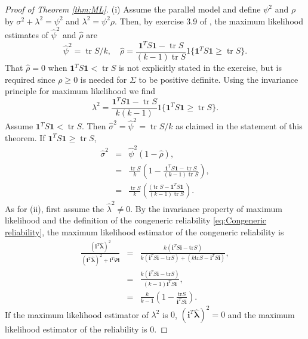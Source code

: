 \documentclass[twoside]{article}
\DeclareMathOperator{\tr}{tr}
\begin{document}
\begin{proof}[Proof of Theorem \ref{thm:ML}]\label{proof:ML}
(i) Assume the parallel model and define $\psi^{2}$ and $\rho$ by
$\sigma^{2}+\lambda^{2}=\psi^{2}$ and $\lambda^{2}=\psi^{2}\rho$.
Then, by exercise 3.9 of \citet[][p. 114]{Muirhead2009-kq}, the maximum likelihood estimates of $\hat{\psi}^{2}$
and $\hat{\rho}$ are
\[
\hat{\psi}^{2}=\tr S/k,\quad\hat{\rho}=\frac{\boldsymbol{1}^{T}S\boldsymbol{1}-\tr S}{(k-1)\tr S}1\{\boldsymbol{1}^{T}S\boldsymbol{1}\geq\tr S\}.
\]
That $\hat{\rho}=0$ when $\boldsymbol{1}^{T}S\boldsymbol{1}<\tr S$
is not explicitly stated in the exercise, but is required since $\rho\geq0$
is needed for $\Sigma$ to be positive definite. Using the invariance
principle for maximum likelihood we find
\[
\lambda^{2} = \frac{\boldsymbol{1}^{T}S\boldsymbol{1}-\tr S}{k(k-1)}1\{\boldsymbol{1}^{T}S\boldsymbol{1}\geq\tr S\}.
\]
Assume $\boldsymbol{1}^{T}S\boldsymbol{1}<\tr S$. Then $\hat{\sigma}^{2}=\hat{\psi}^{2}=\tr S/k$
as claimed in the statement of this theorem. If $\boldsymbol{1}^{T}S\boldsymbol{1}\geq\tr S$,
\begin{eqnarray*}
\hat{\sigma}^{2} & = & \hat{\psi}^{2}(1-\hat{\rho}),\\
 & = & \frac{\tr S}{k}\left(1-\frac{\boldsymbol{1}^{T}S\boldsymbol{1}-\tr S}{(k-1)\tr S}\right),\\
 & = & \frac{\tr S}{k}\left(\frac{(\tr S-\boldsymbol{1}^{T}S\boldsymbol{1}}{(k-1)\tr S}\right).
\end{eqnarray*}
As for (ii), first assume the $\hat{\lambda}^2\neq 0$. By the invariance property of maximum likelihood and the definition of the congeneric reliability \eqref{eq:Congeneric reliability}, the maximum likelihood estimator of the congeneric reliability is
\begin{eqnarray*}
\frac{(\mathbf{i}^{T}\mathbf{\hat{\lambda}})^{2}}{(\mathbf{i}^{T}\mathbf{\hat{\lambda}})^{2}+\mathbf{i}^{T}\Psi\mathbf{i}} & = & \frac{k(\mathbf{i}^{T}S\mathbf{i}-\textrm{tr}S)}{k(\mathbf{i}^{T}S\mathbf{i}-\textrm{tr}S)+(k\textrm{tr}S-\mathbf{i}^{T}S\mathbf{i})},\\
 & = & \frac{k(\mathbf{i}^{T}S\mathbf{i}-\textrm{tr}S)}{(k-1)\mathbf{i}^{T}S\mathbf{i}},\\
 & = & \frac{k}{k-1}\left(1-\frac{\textrm{tr}S}{\mathbf{i}^{T}S\mathbf{i}}\right).
\end{eqnarray*}
If the maximum likelihood estimator of $\lambda^{2}$ is $0$, $(\mathbf{i}^{T}\mathbf{\hat{\lambda}})^{2}=0$
and the maximum likelihood estimator of the reliability is $0.$
\end{proof}
\end{document}
